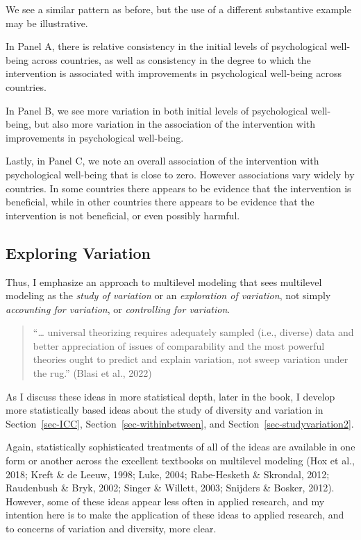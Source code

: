 \documentclass[
  letterpaper,
  DIV=11,
  numbers=noendperiod]{scrreprt}
\begin{document}
We see a similar pattern as before, but the use of a different
substantive example may be illustrative.

In Panel A, there is relative consistency in the initial levels of
psychological well-being across countries, as well as consistency in the
degree to which the intervention is associated with improvements in
psychological well-being across countries.

In Panel B, we see more variation in both initial levels of
psychological well-being, but also more variation in the association of
the intervention with improvements in psychological well-being.

Lastly, in Panel C, we note an overall association of the intervention
with psychological well-being that is close to zero. However
associations vary widely by countries. In some countries there appears
to be evidence that the intervention is beneficial, while in other
countries there appears to be evidence that the intervention is not
beneficial, or even possibly harmful.

\subsection{Exploring Variation}\label{exploring-variation}

Thus, I emphasize an approach to multilevel modeling that sees
multilevel modeling as the \emph{study of variation} or an
\emph{exploration of variation}, not simply \emph{accounting for
variation}, or \emph{controlling for variation}.
 

\begin{quote}
``\ldots{} universal theorizing requires adequately sampled (i.e.,
diverse) data and better appreciation of issues of comparability and the
most powerful theories ought to predict and explain variation, not sweep
variation under the rug.'' (Blasi et al., 2022)
\end{quote}

As I discuss these ideas in more statistical depth, later in the book, I
develop more statistically based ideas about the study of diversity and
variation in Section~\ref{sec-ICC}, Section~\ref{sec-withinbetween}, and
Section~\ref{sec-studyvariation2}.

Again, statistically sophisticated treatments of all of the ideas are
available in one form or another across the excellent textbooks on
multilevel modeling (Hox et al., 2018; Kreft \& de Leeuw, 1998; Luke,
2004; Rabe-Hesketh \& Skrondal, 2012; Raudenbush \& Bryk, 2002; Singer
\& Willett, 2003; Snijders \& Bosker, 2012). However, some of these
ideas appear less often in applied research, and my intention here is to
make the application of these ideas to applied research, and to concerns
of variation and diversity, more clear.
\end{document}

